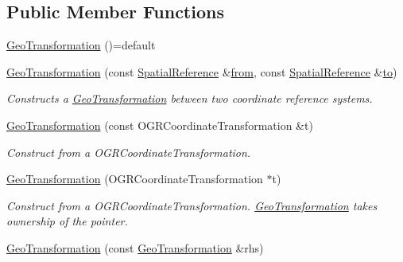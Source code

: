 \subsection*{Public Member Functions}
\begin{DoxyCompactItemize}
\item 
\hyperlink{classdg_1_1deepcore_1_1geometry_1_1_geo_transformation_a8791803539260e5b62b099ab3eb8ddfa}{Geo\+Transformation} ()=default
\item 
\hyperlink{classdg_1_1deepcore_1_1geometry_1_1_geo_transformation_aa58054eed25c58cc4adea026123ae879}{Geo\+Transformation} (const \hyperlink{classdg_1_1deepcore_1_1geometry_1_1_spatial_reference}{Spatial\+Reference} \&\hyperlink{classdg_1_1deepcore_1_1geometry_1_1_geo_transformation_a38e2d96b36aed7db3a87fca5b313b0aa}{from}, const \hyperlink{classdg_1_1deepcore_1_1geometry_1_1_spatial_reference}{Spatial\+Reference} \&\hyperlink{classdg_1_1deepcore_1_1geometry_1_1_geo_transformation_a1f0952b9e9d094c7702c9669a0b205e0}{to})
\begin{DoxyCompactList}\small\item\em Constructs a \hyperlink{classdg_1_1deepcore_1_1geometry_1_1_geo_transformation}{Geo\+Transformation} between two coordinate reference systems. \end{DoxyCompactList}\item 
\hyperlink{classdg_1_1deepcore_1_1geometry_1_1_geo_transformation_a3681c3f9779f4c568c8c2f15d260b6cc}{Geo\+Transformation} (const O\+G\+R\+Coordinate\+Transformation \&t)
\begin{DoxyCompactList}\small\item\em Construct from a {\ttfamily O\+G\+R\+Coordinate\+Transformation}. \end{DoxyCompactList}\item 
\hyperlink{classdg_1_1deepcore_1_1geometry_1_1_geo_transformation_a23797c7c7e843eb1f6959bf213213cc3}{Geo\+Transformation} (O\+G\+R\+Coordinate\+Transformation $\ast$t)
\begin{DoxyCompactList}\small\item\em Construct from a {\ttfamily O\+G\+R\+Coordinate\+Transformation}. \hyperlink{classdg_1_1deepcore_1_1geometry_1_1_geo_transformation}{Geo\+Transformation} takes ownership of the pointer. \end{DoxyCompactList}\item 
\hyperlink{classdg_1_1deepcore_1_1geometry_1_1_geo_transformation_a062ab090d4afd46b424921de435557f7}{Geo\+Transformation} (const \hyperlink{classdg_1_1deepcore_1_1geometry_1_1_geo_transformation}{Geo\+Transformation} \&rhs)

\end{DoxyCompactItemize}
